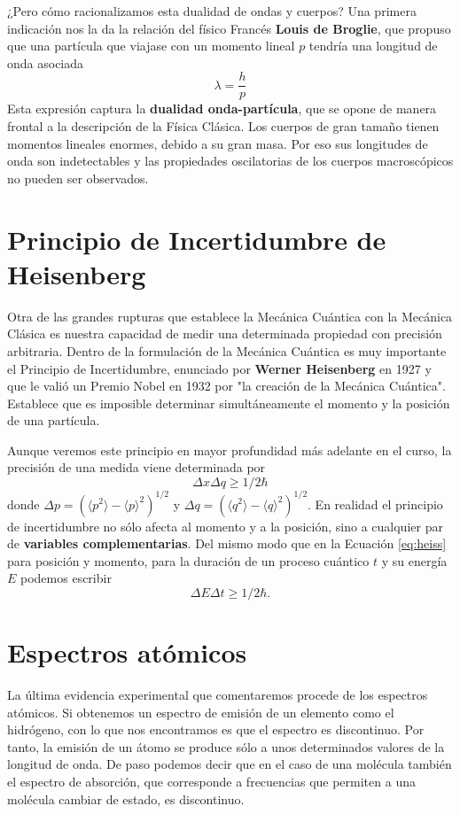 ¿Pero cómo racionalizamos esta dualidad de ondas y cuerpos?
Una primera indicación nos la da la relación del físico Francés
\textbf{Louis de Broglie}, que propuso que una partícula que viajase
con un momento lineal $p$ tendría una longitud de onda asociada
\begin{equation}
\lambda=\frac{h}{p}\label{eq:debroglie}
\end{equation}
Esta expresión captura la \textbf{dualidad onda-partícula},
que se opone de manera frontal a la descripción de la Física 
Clásica.
Los cuerpos de gran tamaño tienen momentos lineales enormes, debido
a su gran masa. Por eso sus longitudes de onda son indetectables
y las propiedades oscilatorias de los cuerpos macroscópicos no 
pueden ser observados.	

\section{Principio de Incertidumbre de Heisenberg}
Otra de las grandes rupturas que establece la Mecánica Cuántica 
con la Mecánica Clásica es nuestra capacidad de medir una 
determinada propiedad con precisión arbitraria. Dentro de la 
formulación de la Mecánica Cuántica es muy importante el Principio
de Incertidumbre, enunciado por \textbf{Werner Heisenberg} en 1927
y que le valió un Premio Nobel en 1932 por "la creación de la Mecánica
Cuántica". 
Establece que es imposible determinar simultáneamente el momento 
y la posición de una partícula. 

Aunque veremos este principio en 
mayor profundidad más adelante en el curso, la precisión de una
medida viene determinada por
\begin{equation}
    \Delta x\Delta q\geq 1/2\hbar\label{eq:heiss}
\end{equation}
donde $\Delta p=(\langle p^2\rangle-\langle p \rangle^2)^{1/2}$ y
$\Delta q=(\langle q^2\rangle-\langle q\rangle^2)^{1/2}$. En realidad
el principio de incertidumbre no sólo afecta al momento y a la posición, sino a 
cualquier par de \textbf{variables complementarias}. Del mismo modo
que en la Ecuación \ref{eq:heiss} para posición y momento, para 
la duración de un proceso cuántico $t$ y su energía $E$ podemos
escribir
\begin{equation}
    \Delta E\Delta t\geq 1/2\hbar.
\end{equation}

\section{Espectros atómicos}
La última evidencia experimental que comentaremos procede de los 
espectros atómicos. Si  obtenemos un espectro de emisión
de un elemento como el hidrógeno, con lo que nos encontramos
es que el espectro es discontinuo. Por tanto, la emisión de un
átomo se produce sólo a unos determinados valores de la longitud
de onda. De paso podemos decir que en el caso de una molécula 
también el espectro de absorción, que corresponde a frecuencias
que permiten a una molécula cambiar de estado, es discontinuo.

